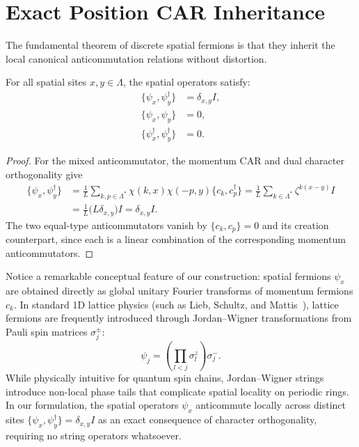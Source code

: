\section{Exact Position CAR Inheritance}

The fundamental theorem of discrete spatial fermions is that they inherit the local canonical anticommutation relations without distortion.

\begin{theorem}
\label{thm:spatial_car}
For all spatial sites $x, y \in \Lambda$, the spatial operators satisfy:
\begin{align}
\{\psi_x, \psi_y^\dagger\} &= \delta_{x, y} I, \label{eq:pos_car_mixed} \\
\{\psi_x, \psi_y\} &= 0, \label{eq:pos_car_ann} \\
\{\psi_x^\dagger, \psi_y^\dagger\} &= 0. \label{eq:pos_car_cre}
\end{align}
\end{theorem}

\begin{proof}
For the mixed anticommutator, the momentum CAR and dual character orthogonality give
\begin{align}
\{\psi_x,\psi_y^\dagger\}
&=\frac1L\sum_{k,p\in\Lambda^*}\chi(k,x)\chi(-p,y)\{c_k,c_p^\dagger\}
=\frac1L\sum_{k\in\Lambda^*}\zeta^{k(x-y)}I\\
&=\frac1L\bigl(L\delta_{x,y}\bigr)I=\delta_{x,y}I.
\end{align}
The two equal-type anticommutators vanish by $\{c_k,c_p\}=0$ and its creation counterpart, since each is a linear combination of the corresponding momentum anticommutators.
\end{proof}

\begin{remark}
Notice a remarkable conceptual feature of our construction: spatial fermions $\psi_x$ are obtained directly as global unitary Fourier transforms of momentum fermions $c_k$. In standard 1D lattice physics (such as Lieb, Schultz, and Mattis~\cite{lieb1961}), lattice fermions are frequently introduced through Jordan--Wigner transformations from Pauli spin matrices $\sigma_j^\pm$:
\begin{equation}
\psi_j = \left( \prod_{l < j} \sigma_l^z \right) \sigma_j^-.
\end{equation}
While physically intuitive for quantum spin chains, Jordan--Wigner strings introduce non-local phase tails that complicate spatial locality on periodic rings. In our formulation, the spatial operators $\psi_x$ anticommute locally across distinct sites $\{\psi_x, \psi_y^\dagger\} = \delta_{x, y} I$ as an exact consequence of character orthogonality, requiring no string operators whatsoever.
\end{remark}

